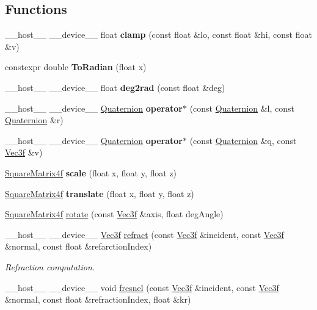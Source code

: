 \subsection*{Functions}
\begin{DoxyCompactItemize}
\item 
\+\_\+\+\_\+host\+\_\+\+\_\+ \+\_\+\+\_\+device\+\_\+\+\_\+ float {\bfseries clamp} (const float \&lo, const float \&hi, const float \&v)
\item 
constexpr double {\bfseries To\+Radian} (float x)
\item 
\+\_\+\+\_\+host\+\_\+\+\_\+ \+\_\+\+\_\+device\+\_\+\+\_\+ float {\bfseries deg2rad} (const float \&deg)
\item 
\+\_\+\+\_\+host\+\_\+\+\_\+ \+\_\+\+\_\+device\+\_\+\+\_\+ \hyperlink{class_quaternion}{Quaternion} {\bfseries operator$\ast$} (const \hyperlink{class_quaternion}{Quaternion} \&l, const \hyperlink{class_quaternion}{Quaternion} \&r)
\item 
\+\_\+\+\_\+host\+\_\+\+\_\+ \+\_\+\+\_\+device\+\_\+\+\_\+ \hyperlink{class_quaternion}{Quaternion} {\bfseries operator$\ast$} (const \hyperlink{class_quaternion}{Quaternion} \&q, const \hyperlink{class_vec3}{Vec3f} \&v)
\item 
\hyperlink{class_square_matrix4}{Square\+Matrix4f} {\bfseries scale} (float x, float y, float z)
\item 
\hyperlink{class_square_matrix4}{Square\+Matrix4f} {\bfseries translate} (float x, float y, float z)
\item 
\hyperlink{class_square_matrix4}{Square\+Matrix4f} \hyperlink{group__linear__algebra_gac7b995c759cd539cf455cae62c4184e6}{rotate} (const \hyperlink{class_vec3}{Vec3f} \&axis, float deg\+Angle)
\item 
\+\_\+\+\_\+host\+\_\+\+\_\+ \+\_\+\+\_\+device\+\_\+\+\_\+ \hyperlink{class_vec3}{Vec3f} \hyperlink{group__linear__algebra_gaabecdc3e2c4f70f7330aaa6eae1300ac}{refract} (const \hyperlink{class_vec3}{Vec3f} \&incident, const \hyperlink{class_vec3}{Vec3f} \&normal, const float \&refarction\+Index)
\begin{DoxyCompactList}\small\item\em Refraction computation. \end{DoxyCompactList}\item 
\+\_\+\+\_\+host\+\_\+\+\_\+ \+\_\+\+\_\+device\+\_\+\+\_\+ void \hyperlink{group__linear__algebra_ga02c442d21d81c8d0cf889f830eddc236}{fresnel} (const \hyperlink{class_vec3}{Vec3f} \&incident, const \hyperlink{class_vec3}{Vec3f} \&normal, const float \&refraction\+Index, float \&kr)

\end{DoxyCompactItemize}

